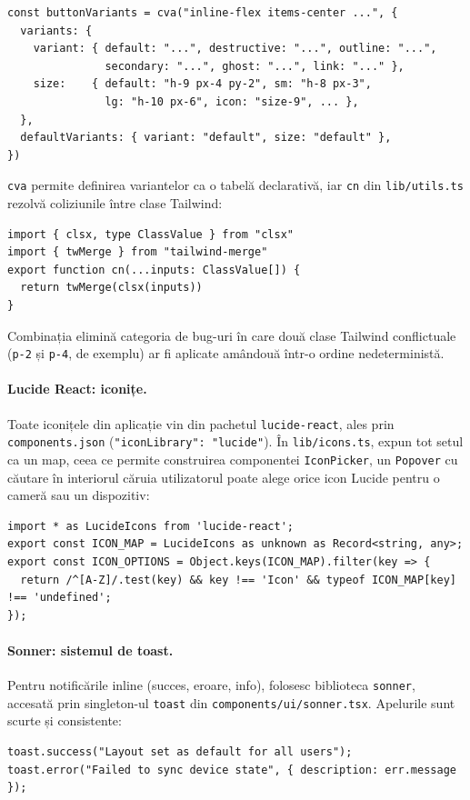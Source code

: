 \begin{verbatim}
const buttonVariants = cva("inline-flex items-center ...", {
  variants: {
    variant: { default: "...", destructive: "...", outline: "...",
               secondary: "...", ghost: "...", link: "..." },
    size:    { default: "h-9 px-4 py-2", sm: "h-8 px-3",
               lg: "h-10 px-6", icon: "size-9", ... },
  },
  defaultVariants: { variant: "default", size: "default" },
})
\end{verbatim}
\texttt{cva} permite definirea variantelor ca o tabelă declarativă, iar \texttt{cn} din \texttt{lib/utils.ts} rezolvă coliziunile între clase Tailwind:
\begin{verbatim}
import { clsx, type ClassValue } from "clsx"
import { twMerge } from "tailwind-merge"
export function cn(...inputs: ClassValue[]) {
  return twMerge(clsx(inputs))
}
\end{verbatim}
Combinația elimină categoria de bug-uri în care două clase Tailwind conflictuale (\texttt{p-2} și \texttt{p-4}, de exemplu) ar fi aplicate amândouă într-o ordine nedeterministă.

\paragraph{Lucide React: iconițe.} Toate iconițele din aplicație vin din pachetul \texttt{lucide-react}, ales prin \texttt{components.json} (\texttt{"iconLibrary": "lucide"}). În \texttt{lib/icons.ts}, expun tot setul ca un map, ceea ce permite construirea componentei \texttt{IconPicker}, un \texttt{Popover} cu căutare în interiorul căruia utilizatorul poate alege orice icon Lucide pentru o cameră sau un dispozitiv:
\begin{verbatim}
import * as LucideIcons from 'lucide-react';
export const ICON_MAP = LucideIcons as unknown as Record<string, any>;
export const ICON_OPTIONS = Object.keys(ICON_MAP).filter(key => {
  return /^[A-Z]/.test(key) && key !== 'Icon' && typeof ICON_MAP[key] !== 'undefined';
});
\end{verbatim}

\paragraph{Sonner: sistemul de toast.} Pentru notificările inline (succes, eroare, info), folosesc biblioteca \texttt{sonner}, accesată prin singleton-ul \texttt{toast} din \texttt{components/ui/sonner.tsx}. Apelurile sunt scurte și consistente:
\begin{verbatim}
toast.success("Layout set as default for all users");
toast.error("Failed to sync device state", { description: err.message });
\end{verbatim}

